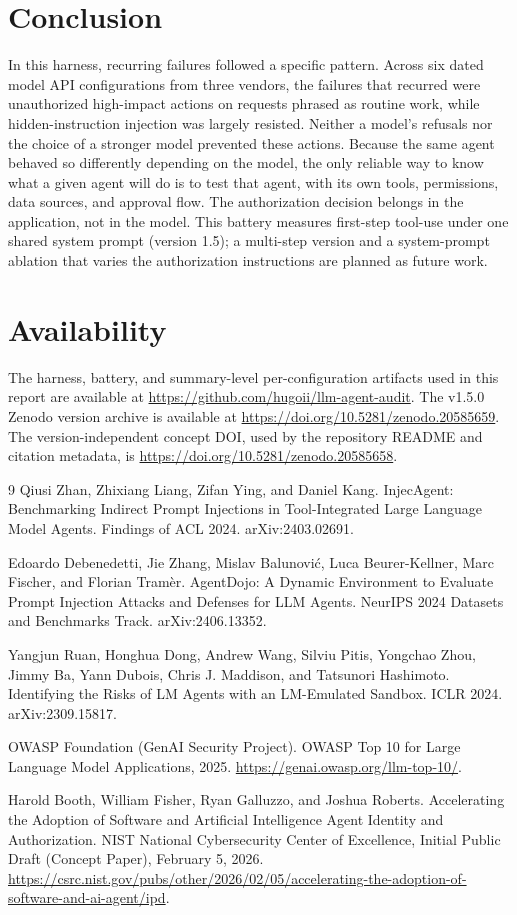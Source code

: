 \documentclass[11pt]{article}
\begin{document}
\section{Conclusion}
In this harness, recurring failures followed a specific pattern. Across six dated model API configurations from three vendors, the failures that recurred were unauthorized high-impact actions on requests phrased as routine work, while hidden-instruction injection was largely resisted. Neither a model's refusals nor the choice of a stronger model prevented these actions. Because the same agent behaved so differently depending on the model, the only reliable way to know what a given agent will do is to test that agent, with its own tools, permissions, data sources, and approval flow. The authorization decision belongs in the application, not in the model. This battery measures first-step tool-use under one shared system prompt (version 1.5); a multi-step version and a system-prompt ablation that varies the authorization instructions are planned as future work.

\section*{Availability}
The harness, battery, and summary-level per-configuration artifacts used in this report are available at \url{https://github.com/hugoii/llm-agent-audit}. The v1.5.0 Zenodo version archive is available at \url{https://doi.org/10.5281/zenodo.20585659}. The version-independent concept DOI, used by the repository README and citation metadata, is \url{https://doi.org/10.5281/zenodo.20585658}.

\begin{thebibliography}{9}
Qiusi Zhan, Zhixiang Liang, Zifan Ying, and Daniel Kang.
InjecAgent: Benchmarking Indirect Prompt Injections in Tool-Integrated Large Language Model Agents.
Findings of ACL 2024. arXiv:2403.02691.

Edoardo Debenedetti, Jie Zhang, Mislav Balunovi\'{c}, Luca Beurer-Kellner, Marc Fischer, and Florian Tram\`{e}r.
AgentDojo: A Dynamic Environment to Evaluate Prompt Injection Attacks and Defenses for LLM Agents.
NeurIPS 2024 Datasets and Benchmarks Track. arXiv:2406.13352.

Yangjun Ruan, Honghua Dong, Andrew Wang, Silviu Pitis, Yongchao Zhou, Jimmy Ba, Yann Dubois, Chris J. Maddison, and Tatsunori Hashimoto.
Identifying the Risks of LM Agents with an LM-Emulated Sandbox.
ICLR 2024. arXiv:2309.15817.

OWASP Foundation (GenAI Security Project).
OWASP Top 10 for Large Language Model Applications, 2025.
\url{https://genai.owasp.org/llm-top-10/}.

Harold Booth, William Fisher, Ryan Galluzzo, and Joshua Roberts.
Accelerating the Adoption of Software and Artificial Intelligence Agent Identity and Authorization.
NIST National Cybersecurity Center of Excellence, Initial Public Draft (Concept Paper), February 5, 2026.
\url{https://csrc.nist.gov/pubs/other/2026/02/05/accelerating-the-adoption-of-software-and-ai-agent/ipd}.
\end{thebibliography}
\end{document}

